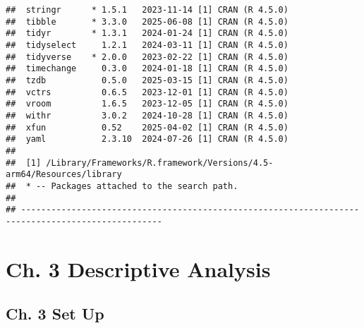 \documentclass[
]{book}
\begin{document}
\begin{verbatim}
##  stringr      * 1.5.1   2023-11-14 [1] CRAN (R 4.5.0)
##  tibble       * 3.3.0   2025-06-08 [1] CRAN (R 4.5.0)
##  tidyr        * 1.3.1   2024-01-24 [1] CRAN (R 4.5.0)
##  tidyselect     1.2.1   2024-03-11 [1] CRAN (R 4.5.0)
##  tidyverse    * 2.0.0   2023-02-22 [1] CRAN (R 4.5.0)
##  timechange     0.3.0   2024-01-18 [1] CRAN (R 4.5.0)
##  tzdb           0.5.0   2025-03-15 [1] CRAN (R 4.5.0)
##  vctrs          0.6.5   2023-12-01 [1] CRAN (R 4.5.0)
##  vroom          1.6.5   2023-12-05 [1] CRAN (R 4.5.0)
##  withr          3.0.2   2024-10-28 [1] CRAN (R 4.5.0)
##  xfun           0.52    2025-04-02 [1] CRAN (R 4.5.0)
##  yaml           2.3.10  2024-07-26 [1] CRAN (R 4.5.0)
## 
##  [1] /Library/Frameworks/R.framework/Versions/4.5-arm64/Resources/library
##  * -- Packages attached to the search path.
## 
## --------------------------------------------------------------------------------------------------
\end{verbatim}

\section{Ch. 3 Descriptive Analysis}\label{sec:rcode-ch3}

\subsection{Ch. 3 Set Up}\label{ch.-3-set-up}
\end{document}
